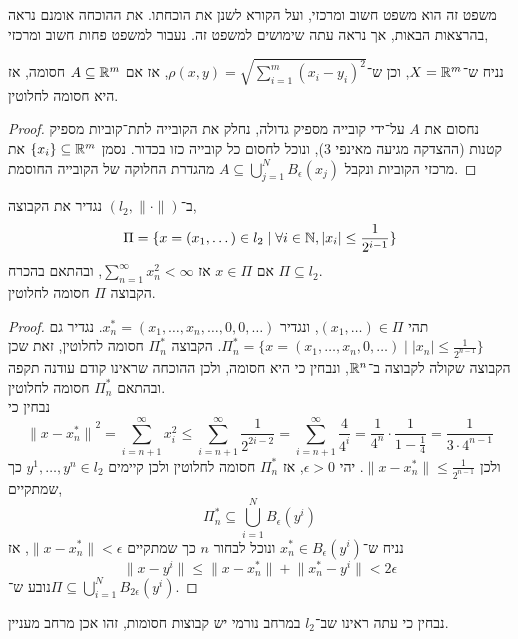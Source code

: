 משפט זה הוא משפט חשוב ומרכזי, ועל הקורא לשנן את הוכחתו. את ההוכחה אומנם נראה בהרצאות הבאות, אך נראה עתה שימושים למשפט זה.
נעבור למשפט פחות חשוב ומרכזי,
\begin{theorem}
	נניח ש־$X = \mathbb{R}^m$, וכן ש־$\rho(x, y) = \sqrt{\sum_{i = 1}^{m} {(x_i - y_i)}^2}$, אז אם $A \subseteq \mathbb{R}^m$ חסומה, אז היא חסומה לחלוטין.
\end{theorem}
\begin{proof}
	נחסום את $A$ על־ידי קובייה מספיק גדולה, נחלק את הקובייה לתת־קוביות מספיק קטנות (ההצדקה מגיעה מאינפי 3), ונוכל לחסום כל קובייה כזו בכדור.
	נסמן $\{ x_i \} \subseteq \mathbb{R}^m$ את מרכזי הקוביות ונקבל $A \subseteq \bigcup_{j = 1}^N B_\epsilon(x_j)$ מהגדרת החלוקה של הקובייה החוסמת.
\end{proof}
\begin{proposition}
	ב־$(l_2, \lVert \cdot \rVert)$ נגדיר את הקבוצה,
	\[
		\Pi = \{ x = (x_1, \dots) \in l_2 \mid \forall i \in \mathbb{N}, |x_i| \le \frac{1}{2^{i - 1}} \}
	\]
	אם $x \in \Pi$ אז $\sum_{n = 1}^{\infty} x_n^2 < \infty$, ובהתאם בהכרח $\Pi \subseteq l_2$. \\
	הקבוצה $\Pi$ חסומה לחלוטין.
\end{proposition}
\begin{proof}
	תהי $(x_1, \dots) \in \Pi$, ונגדיר $x_n^* = (x_1, \dots, x_n, \dots, 0, 0, \dots)$.
	נגדיר גם $\Pi^*_n = \{ x = (x_1, \dots, x_n, 0, \dots) \mid |x_n| \le \frac{1}{2^{n - 1}} \}$.
	הקבוצה $\Pi_n^*$ חסומה לחלוטין, זאת שכן הקבוצה שקולה לקבוצה ב־$\mathbb{R}^n$, ונבחין כי היא חסומה, ולכן ההוכחה שראינו קודם עודנה תקפה ובהתאם $\Pi_n^*$ חסומה לחלוטין. \\
	נבחין כי
	\[
		{\lVert x - x_n^* \rVert}^2
		= \sum_{i = n + 1}^{\infty} x_i^2
		\le \sum_{i = n + 1}^{\infty} \frac{1}{2^{2i - 2}}
		= \sum_{i = n + 1}^{\infty} \frac{4}{4^i}
		= \frac{1}{4^n} \cdot \frac{1}{1 - \frac{1}{4}}
		= \frac{1}{3 \cdot 4^{n - 1}}
	\]
	ולכן $\lVert x - x_n^* \rVert \le \frac{1}{2^{n - 1}}$.
	יהי $\epsilon > 0$, אז $\Pi_n^*$ חסומה לחלוטין ולכן קיימים $y^1, \dots, y^n \in l_2$ כך שמתקיים,
	\[
		\Pi_n^* \subseteq \bigcup_{i = 1}^N B_\epsilon(y^i)
	\]
	נניח ש־$x_n^* \in B_\epsilon(y^i)$ ונוכל לבחור $n$ כך שמתקיים $\lVert x - x_n^* \rVert < \epsilon$, אז
	\[
		\lVert x - y^i \rVert
		\le \lVert x - x_n^* \rVert + \lVert x_n^* - y^i \rVert
		< 2 \epsilon
	\]
	נובע ש־$\Pi \subseteq \bigcup_{i = 1}^N B_{2\epsilon}(y^i)$.
\end{proof}
נבחין כי עתה ראינו שב־$l_2$ במרחב נורמי יש קבוצות חסומות, זהו אכן מרחב מעניין.

